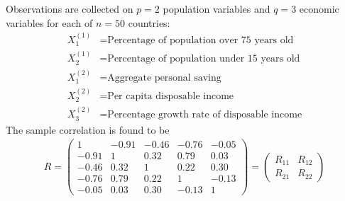 \documentclass[12pt]{extarticle}
\newcommand{\<}{\langle}
\renewcommand{\>}{\rangle}
\theoremstyle{definition}
\begin{document}
\begin{tcolorbox}[enhanced, drop fuzzy shadow, title=Example 10.1]
Observations are collected on $p=2$ population variables and $q=3$ economic variables for each of $n=50$ countries:
\begin{align*}
    X_1^{(1)} &= \text{Percentage of population over 75 years old}\\
    X_2^{(1)} &= \text{Percentage of population under 15 years old}\\
    X_1^{(2)} &= \text{Aggregate personal saving}\\
    X_2^{(2)} &= \text{Per capita disposable income}\\
    X_3^{(2)} &= \text{Percentage growth rate of disposable income}
\end{align*}
The sample correlation is found to be
\begin{align*}
    R = \left(\begin{array}{cc|ccc}
        1 & -0.91 & -0.46 & -0.76 & -0.05 \\
        -0.91 & 1 & 0.32 & 0.79 & 0.03 \\ \hline
        -0.46 & 0.32 & 1 & 0.22 & 0.30 \\
        -0.76 & 0.79 & 0.22 & 1 & -0.13 \\
        -0.05 & 0.03 & 0.30 & -0.13 & 1
        \end{array} \right) = \left(\begin{array}{cc}
        R_{11} & R_{12} \\
        R_{21} & R_{22}
        \end{array} \right)
\end{align*}
\end{tcolorbox}
\end{document}
